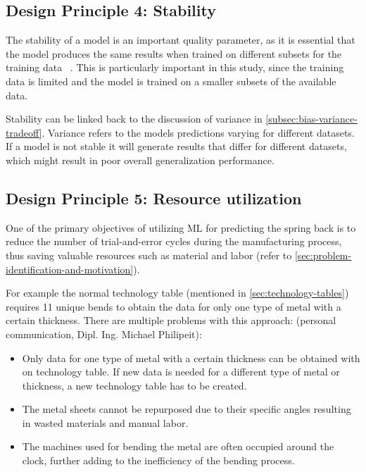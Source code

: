 \subsection*{Design Principle 4: Stability}

The stability of a model is an important quality parameter, as it is essential that
the model produces the same results when trained on different subsets for the training data
~\cite[p. 16]{siebert2022construction}.
This is particularly important in this study, since the training data is limited and the model is trained on a
smaller subsets of the available data.

Stability can be linked back to the discussion of variance in \cref{subsec:bias-variance-tradeoff}.
Variance refers to the models predictions varying for different datasets. If a model is not stable it will generate
results that differ for different datasets, which might result in poor overall generalization performance.


\subsection*{Design Principle 5: Resource utilization}\label{subsec:dp5-resource-utilization}
One of the primary objectives of utilizing ML for predicting the spring back is to
reduce the number of trial-and-error cycles during the manufacturing process, thus saving
valuable resources such as material and labor
(refer to \cref{sec:problem-identification-and-motivation}).

For example the normal technology table (mentioned in \cref{sec:technology-tables}) requires 11 unique bends to obtain
the
data
for only one type of metal with a certain thickness.
There are multiple problems with this approach: (personal communication, Dipl. Ing. Michael Philipeit):
\begin{itemize}
    \item Only data for one type of metal with a certain thickness can be obtained with on technology table. If new data
    is needed for a different type of metal or thickness, a new technology table has to be created.
    \item The metal sheets cannot be repurposed due to their specific angles resulting in wasted materials and manual
    labor.
    \item The machines used for bending the metal are often occupied around the clock, further adding to the
    inefficiency of the bending process.
\end{itemize}

